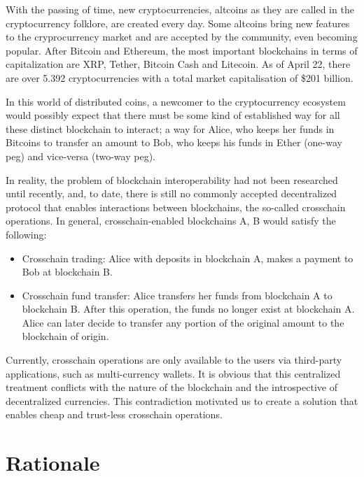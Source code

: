 With the passing of time, new cryptocurrencies, altcoins as they are called in
the cryptocurrency folklore, are created every day. Some altcoins bring new
features to the cryprocurrency market and are accepted by the community, even
becoming popular. After Bitcoin and Ethereum, the most important blockchains in
terms of capitalization are XRP, Tether, Bitcoin Cash and Litecoin. As of April
22, there are over 5.392 cryptocurrencies with a total market capitalisation of
\$201 billion.

In this world of distributed coins, a newcomer to the cryptocurrency ecosystem
would possibly expect that there must be some kind of established way for all
these distinct blockchain to interact; a way for Alice, who keeps her funds in
Bitcoins to transfer an amount to Bob, who keeps his funds in Ether (one-way
peg) and vice-versa (two-way peg).

In reality, the problem of blockchain interoperability had not been researched
until recently, and, to date, there is still no commonly accepted decentralized
protocol that enables interactions between blockchains, the so-called
crosschain operations.  In general, crosschain-enabled blockchains A, B would
satisfy the following:

\begin{itemize}

    \item Crosschain trading: Alice with deposits in blockchain A, makes a
        payment to Bob at blockchain B.

    \item Crosschain fund transfer: Alice transfers her funds from blockchain A
        to blockchain B. After this operation, the funds no longer exist at
        blockchain A. Alice can later decide to transfer any portion of the
        original amount to the blockchain of origin.

\end{itemize}

Currently, crosschain operations are only available to the users via
third-party applications, such as multi-currency wallets. It is obvious that
this centralized treatment conflicts with the nature of the blockchain and the
introspective of decentralized currencies. This contradiction motivated us to
create a solution that enables cheap and trust-less crosschain operations.

\section{Rationale}

